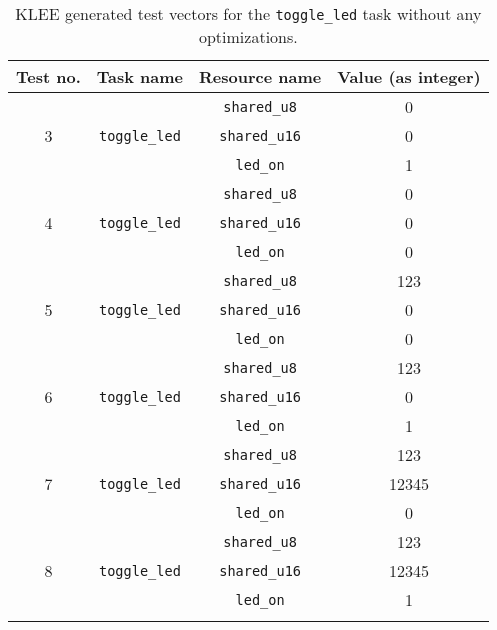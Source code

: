 \begin{longtable}{|c|c|c|c|}
\hline
Test no. & Task name & Resource name & Value (as integer) \\ \hline
\multirow{3}{*}{3} & \multirow{3}{*}{\texttt{toggle\_led}} & \texttt{shared\_u8}  & 0 \\ \cline{3-4} 
                   &                                       & \texttt{shared\_u16} & 0 \\ \cline{3-4} 
                   &                                       & \texttt{led\_on}     & 1 \\ \hline
\multirow{3}{*}{4} & \multirow{3}{*}{\texttt{toggle\_led}} & \texttt{shared\_u8}  & 0 \\ \cline{3-4} 
                   &                                       & \texttt{shared\_u16} & 0 \\ \cline{3-4} 
                   &                                       & \texttt{led\_on}     & 0 \\ \hline
\multirow{3}{*}{5} & \multirow{3}{*}{\texttt{toggle\_led}} & \texttt{shared\_u8}  & 123 \\ \cline{3-4} 
                   &                                       & \texttt{shared\_u16} & 0 \\ \cline{3-4} 
                   &                                       & \texttt{led\_on}     & 0 \\ \hline
\multirow{3}{*}{6} & \multirow{3}{*}{\texttt{toggle\_led}} & \texttt{shared\_u8}  & 123 \\ \cline{3-4} 
                   &                                       & \texttt{shared\_u16} & 0 \\ \cline{3-4} 
                   &                                       & \texttt{led\_on}     & 1 \\ \hline
\multirow{3}{*}{7} & \multirow{3}{*}{\texttt{toggle\_led}} & \texttt{shared\_u8}  & 123 \\ \cline{3-4} 
                   &                                       & \texttt{shared\_u16} & 12345 \\ \cline{3-4} 
                   &                                       & \texttt{led\_on}     & 0 \\ \hline
\multirow{3}{*}{8} & \multirow{3}{*}{\texttt{toggle\_led}} & \texttt{shared\_u8}  & 123 \\ \cline{3-4} 
                   &                                       & \texttt{shared\_u16} & 12345 \\ \cline{3-4} 
                   &                                       & \texttt{led\_on}      & 1 \\ \hline
\caption{KLEE generated test vectors for the \texttt{toggle\_led} task without any optimizations.}
\label{tab:evaldebugteststoggle}
\end{longtable}

